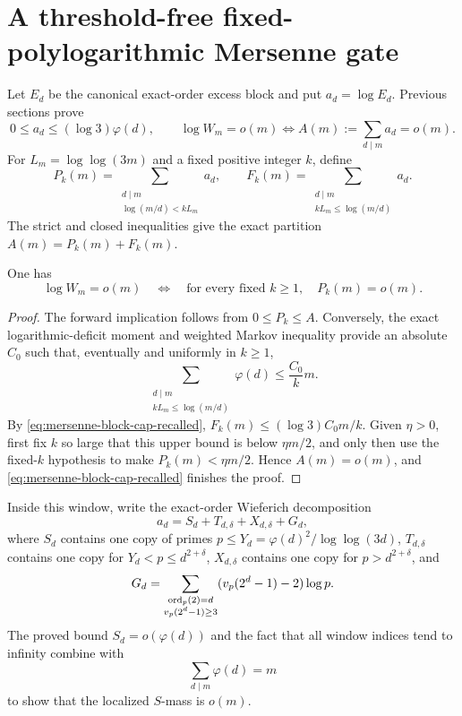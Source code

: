\section{A threshold-free fixed-polylogarithmic Mersenne gate}
\label{sec:mersenne-fixed-polylog-block-mass}

Let $E_d$ be the canonical exact-order excess block and put
$a_d=\log E_d$.  Previous sections prove
\begin{equation}\label{eq:mersenne-block-cap-recalled}
 0\le a_d\le(\log3)\varphi(d),\qquad
 \log W_m=o(m)\Longleftrightarrow
 A(m):=\sum_{d\mid m}a_d=o(m).
\end{equation}
For $L_m=\log\log(3m)$ and a fixed positive integer $k$, define
\[
 P_k(m)=\sum_{\substack{d\mid m\\\log(m/d)<kL_m}}a_d,
 \qquad
 F_k(m)=\sum_{\substack{d\mid m\\kL_m\le\log(m/d)}}a_d.
\]
The strict and closed inequalities give the exact partition
$A(m)=P_k(m)+F_k(m)$.

\begin{theorem}
\label{thm:mersenne-fixed-window-equivalence}
One has
\[
 \log W_m=o(m)
 \quad\Longleftrightarrow\quad
 \text{for every fixed }k\ge1,\quad P_k(m)=o(m).
\]
\end{theorem}

\begin{proof}
The forward implication follows from $0\le P_k\le A$.  Conversely, the
exact logarithmic-deficit moment and weighted Markov inequality provide an
absolute $C_0$ such that, eventually and uniformly in $k\ge1$,
\[
 \sum_{\substack{d\mid m\\kL_m\le\log(m/d)}}\varphi(d)
 \le \frac{C_0}{k}m.
\]
By \eqref{eq:mersenne-block-cap-recalled},
$F_k(m)\le(\log3)C_0m/k$.  Given $\eta>0$, first fix $k$ so large that this
upper bound is below $\eta m/2$, and only then use the fixed-$k$ hypothesis
to make $P_k(m)<\eta m/2$.  Hence $A(m)=o(m)$, and
\eqref{eq:mersenne-block-cap-recalled} finishes the proof.
\end{proof}

Inside this window, write the exact-order Wieferich decomposition
\[
 a_d=S_d+T_{d,\delta}+X_{d,\delta}+G_d,
\]
where $S_d$ contains one copy of primes $p\le
Y_d=\varphi(d)^2/\log\log(3d)$, $T_{d,\delta}$ contains one copy for
$Y_d<p\le d^{2+\delta}$, $X_{d,\delta}$ contains one copy for
$p>d^{2+\delta}$, and
\[
 G_d=\sum_{\substack{\operatorname{ord}_p(2)=d\\v_p(2^d-1)\ge3}}
       (v_p(2^d-1)-2)\log p.
\]
The proved bound $S_d=o(\varphi(d))$ and the fact that all window indices tend
to infinity combine with
\[
 \sum_{d\mid m}\varphi(d)=m
\]
to show that the localized $S$-mass is $o(m)$.

